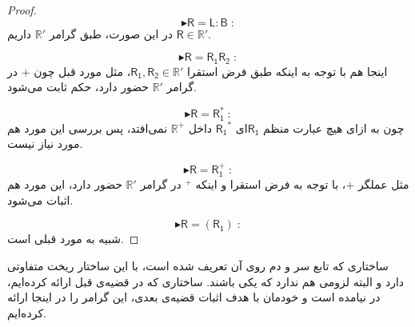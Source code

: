 \begin{proof}
	
	$$\blacktriangleright \mathsf{R=L:B}\;:$$
	در این صورت، طبق گرامر $\mathbb{R'}$ داریم  
	$\mathsf{R} \in \mathbb{R'}$.
	
	$$\blacktriangleright \mathsf{R=R_1 R_2}\;:$$
	اینجا هم با توجه به اینکه طبق فرض استقرا 
	$\mathsf{R_1 , R_2} \in \mathbb{R'}$،
	مثل مورد قبل چون $+$ در گرامر $\mathbb{R'}$ حضور دارد، حکم ثابت می‌شود.
	
	$$\blacktriangleright \mathsf{R=R_1^*}\;:$$
	چون به ازای هیچ عبارت منظم $\mathsf{R_1}$ای 
	$\mathsf{R_1}^*$ داخل $\mathbb{R^+}$ نمی‌افتد، پس بررسی این مورد هم مورد نیاز نیست.
	
	
	$$\blacktriangleright \mathsf{R=R_1^+}\;:$$
	مثل عملگر $+$، با توجه به فرض استقرا و اینکه $ ^+$ در گرامر $\mathbb{R'}$ حضور دارد، این مورد هم اثبات می‌شود.
	
	
	$$\blacktriangleright \mathsf{R=(R_1)}\;:$$
	شبیه به مورد قبلی است.
	
	
	
	
	
	
	
\end{proof}

ساختاری که تابع سر و دم روی آن تعریف شده است، با این ساختار ریخت متفاوتی دارد و البته لزومی هم ندارد که یکی باشند. ساختاری که در قضیه‌ی قبل ارائه کرده‌ایم، در \cite{calcul} نیامده است و خودمان با هدف اثبات قضیه‌ی بعدی، این گرامر را در اینجا ارائه‌ کرده‌ایم.



